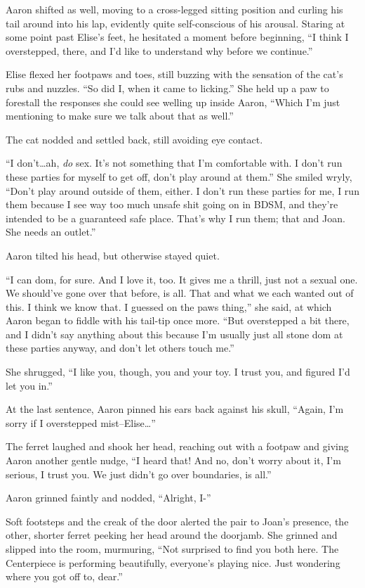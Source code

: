 Aaron shifted as well, moving to a cross-legged sitting position and
curling his tail around into his lap, evidently quite self-conscious of
his arousal. Staring at some point past Elise's feet, he hesitated a
moment before beginning, ``I think I overstepped, there, and I'd like to
understand why before we continue.''

Elise flexed her footpaws and toes, still buzzing with the sensation of
the cat's rubs and nuzzles. ``So did I, when it came to licking.'' She
held up a paw to forestall the responses she could see welling up inside
Aaron, ``Which I'm just mentioning to make sure we talk about that as
well.''

The cat nodded and settled back, still avoiding eye contact.

``I don't\ldots{}ah, \emph{do} sex. It's not something that I'm
comfortable with. I don't run these parties for myself to get off, don't
play around at them.'' She smiled wryly, ``Don't play around outside of
them, either. I don't run these parties for me, I run them because I see
way too much unsafe shit going on in BDSM, and they're intended to be a
guaranteed safe place. That's why I run them; that and Joan. She needs
an outlet.''

Aaron tilted his head, but otherwise stayed quiet.

``I can dom, for sure. And I love it, too. It gives me a thrill, just
not a sexual one. We should've gone over that before, is all. That and
what we each wanted out of this. I think we know that. I guessed on the
paws thing,'' she said, at which Aaron began to fiddle with his tail-tip
once more. ``But overstepped a bit there, and I didn't say anything
about this because I'm usually just all stone dom at these parties
anyway, and don't let others touch me.''

She shrugged, ``I like you, though, you and your toy. I trust you, and
figured I'd let you in.''

At the last sentence, Aaron pinned his ears back against his skull,
``Again, I'm sorry if I overstepped mist--Elise\ldots{}''

The ferret laughed and shook her head, reaching out with a footpaw and
giving Aaron another gentle nudge, ``I heard that! And no, don't worry
about it, I'm serious, I trust you. We just didn't go over boundaries,
is all.''

Aaron grinned faintly and nodded, ``Alright, I-''

Soft footsteps and the creak of the door alerted the pair to Joan's
presence, the other, shorter ferret peeking her head around the
doorjamb. She grinned and slipped into the room, murmuring, ``Not
surprised to find you both here. The Centerpiece is performing
beautifully, everyone's playing nice. Just wondering where you got off
to, dear.''

